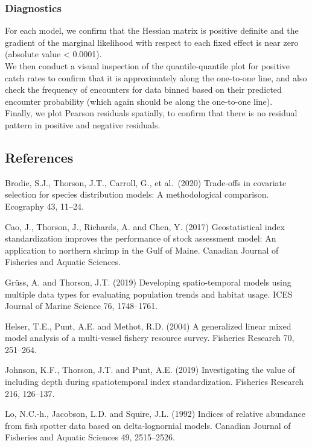 \documentclass[
  11pt,
]{article}
\begin{document}
\hypertarget{diagnostics}{%
\subsubsection{Diagnostics}\label{diagnostics}}

For each model, we confirm that the Hessian matrix is positive definite and the gradient of the marginal likelihood with respect to each fixed effect is near zero (absolute value \textless{} 0.0001).\\
We then conduct a visual inspection of the quantile-quantile plot for positive catch rates to confirm that it is approximately along the one-to-one line, and also check the frequency of encounters for data binned based on their predicted encounter probability (which again should be along the one-to-one line).\\
Finally, we plot Pearson residuals spatially, to confirm that there is no residual pattern in positive and negative residuals.

\hypertarget{references-2}{%
\subsection*{References}\label{references-2}}

Brodie, S.J., Thorson, J.T., Carroll, G., et al.~(2020) Trade-offs in covariate selection for species distribution models: A methodological comparison. Ecography 43, 11--24.

Cao, J., Thorson, J., Richards, A. and Chen, Y. (2017) Geostatistical index standardization improves the performance of stock assessment model: An application to northern shrimp in the Gulf of Maine. Canadian Journal of Fisheries and Aquatic Sciences.

Grüss, A. and Thorson, J.T. (2019) Developing spatio-temporal models using multiple data types for evaluating population trends and habitat usage. ICES Journal of Marine Science 76, 1748--1761.

Helser, T.E., Punt, A.E. and Methot, R.D. (2004) A generalized linear mixed model analysis of a multi-vessel fishery resource survey. Fisheries Research 70, 251--264.

Johnson, K.F., Thorson, J.T. and Punt, A.E. (2019) Investigating the value of including depth during spatiotemporal index standardization. Fisheries Research 216, 126--137.

Lo, N.C.-h., Jacobson, L.D. and Squire, J.L. (1992) Indices of relative abundance from fish spotter data based on delta-lognornial models. Canadian Journal of Fisheries and Aquatic Sciences 49, 2515--2526.
\end{document}
